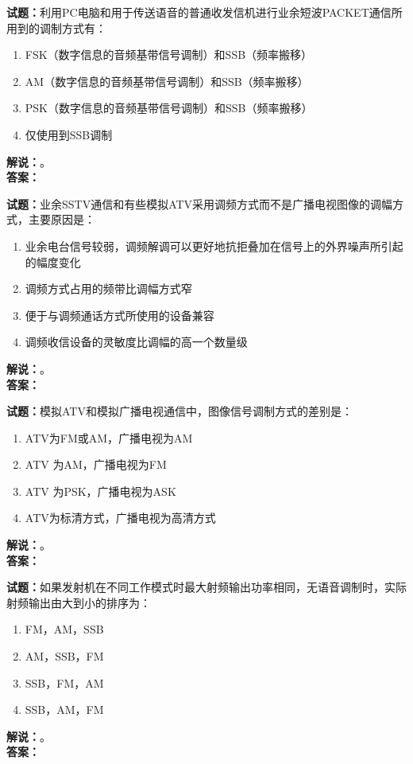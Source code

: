 \documentclass{ctexbook}
\begin{document}
\bigskip




\noindent\textbf{试题：}利用PC电脑和用于传送语音的普通收发信机进行业余短波PACKET通信所用到的调制方式有：
\begin{enumerate}[leftmargin=3em]
\item FSK（数字信息的音频基带信号调制）和SSB（频率搬移）
\item AM（数字信息的音频基带信号调制）和SSB（频率搬移）
\item PSK（数字信息的音频基带信号调制）和SSB（频率搬移）
\item 仅使用到SSB调制
\end{enumerate}
\noindent\textbf{解说：}\textbf{}。\\\noindent\textbf{答案：}

\bigskip




\noindent\textbf{试题：}业余SSTV通信和有些模拟ATV采用调频方式而不是广播电视图像的调幅方式，主要原因是： 
\begin{enumerate}[leftmargin=3em]
\item 业余电台信号较弱，调频解调可以更好地抗拒叠加在信号上的外界噪声所引起的幅度变化
\item 调频方式占用的频带比调幅方式窄
\item 便于与调频通话方式所使用的设备兼容
\item 调频收信设备的灵敏度比调幅的高一个数量级
\end{enumerate}
\noindent\textbf{解说：}\textbf{}。\\\noindent\textbf{答案：}

\bigskip




\noindent\textbf{试题：}模拟ATV和模拟广播电视通信中，图像信号调制方式的差别是：
\begin{enumerate}[leftmargin=3em]
\item ATV为FM或AM，广播电视为AM
\item ATV 为AM，广播电视为FM
\item ATV 为PSK，广播电视为ASK
\item ATV为标清方式，广播电视为高清方式
\end{enumerate}
\noindent\textbf{解说：}\textbf{}。\\\noindent\textbf{答案：}

\bigskip




\noindent\textbf{试题：}如果发射机在不同工作模式时最大射频输出功率相同，无语音调制时，实际射频输出由大到小的排序为：
\begin{enumerate}[leftmargin=3em]
\item FM，AM，SSB
\item AM，SSB，FM
\item SSB，FM，AM
\item SSB，AM，FM
\end{enumerate}
\noindent\textbf{解说：}\textbf{}。\\\noindent\textbf{答案：}
\end{document}
